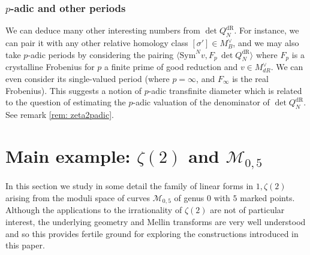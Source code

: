 \documentclass[a4paper,10pt]{amsart}
\theoremstyle{definition}
\theoremstyle{remark}
\numberwithin{equation}{section}
\newcommand{\dR}{\mathrm{dR}}
\newcommand{\ff}{\mathfrak{f}}
\newcommand{\0}{\color{blue}{\mathsf{0}}}
\begin{document}
\subsubsection{$p$-adic and other periods} \label{subsect:padic}
  
  We can deduce many other interesting numbers from $\det Q^{\dR}_N$. For instance,  we  can pair it  with any other relative homology class $[\sigma'] \in M_B^{\vee}$, and  we may also take $p$-adic periods by considering the pairing $\langle \mathrm{Sym}^{N} v, F_p \, \det Q^{\dR}_N\rangle$  where $F_p$ is a crystalline Frobenius  for $p$  a finite prime of good reduction and $v\in M_{dR}^{\vee}$.  We can even consider its single-valued period (where $p=\infty$, and $F_{\infty}$ is the real Frobenius).   This  suggests a notion of $p$-adic transfinite diameter which is related to the question of estimating the $p$-adic valuation of the denominator  of $\det Q^{\dR}_N$.  See remark \ref{rem: zeta2padic}. 
  
  
 
  \section{Main example: $\zeta(2)$ and $\mathcal{M}_{0,5}$}  \label{sect:MainExample}
  In this section we study in some detail the family of linear forms in $1,\zeta(2)$ arising from the moduli space of curves $\mathcal{M}_{0,5}$ of genus $0$ with $5$ marked points. Although the applications to the  irrationality of $\zeta(2)$ are not of particular interest, the underlying geometry and Mellin transforms are very well understood and so this provides fertile ground for exploring the 
 constructions introduced in this paper.
  
\end{document}
